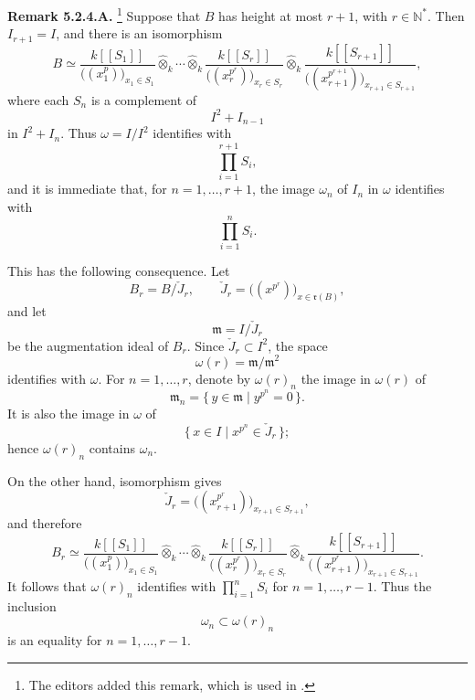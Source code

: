 
\medskip
\noindent\textbf{Remark 5.2.4.A.}
\label{sga3:VIIB:5.2.4.A}
\footnote{\label{sga3:VIIB:nde:161}The editors added this remark,
which is used in .}
Suppose that \(B\) has height at most \(r+1\), with
\(r\in\mathbb N^*\). Then \(I_{r+1}=I\), and there is an
isomorphism
\[
\tag{1}\label{sga3:vii:remark:5-2-4-a:equation:1}
  B
  \simeq
  \frac{k[[S_1]]}{\bigl((x_1^p)\bigr)_{x_1\in S_1}}
  \widehat\otimes_k\cdots\widehat\otimes_k
  \frac{k[[S_r]]}{\bigl((x_r^{p^r})\bigr)_{x_r\in S_r}}
  \widehat\otimes_k
  \frac{k[[S_{r+1}]]}
       {\bigl((x_{r+1}^{p^{r+1}})\bigr)_{x_{r+1}\in S_{r+1}}},
\]
where each \(S_n\) is a complement of
\[
  I^2+I_{n-1}
\]
in \(I^2+I_n\). Thus \(\omega=I/I^2\) identifies with
\[
  \prod_{i=1}^{r+1}S_i,
\]
and it is immediate that, for \(n=1,\ldots,r+1\), the image
\(\omega_n\) of \(I_n\) in \(\omega\) identifies with
\[
  \prod_{i=1}^{n}S_i.
\]

This has the following consequence. Let
\[
  B_r=B/\check J_r,
  \qquad
  \check J_r
  =
  \bigl((x^{p^r})\bigr)_{x\in\mathfrak r(B)},
\]
and let
\[
  \mathfrak m=I/\check J_r
\]
be the augmentation ideal of \(B_r\). Since
\(\check J_r\subset I^2\), the space
\[
  \omega(r)=\mathfrak m/\mathfrak m^2
\]
identifies with \(\omega\). For \(n=1,\ldots,r\), denote by
\(\omega(r)_n\) the image in \(\omega(r)\) of
\[
  \mathfrak m_n
  =
  \{\,y\in\mathfrak m\mid y^{p^n}=0\,\}.
\]
It is also the image in \(\omega\) of
\[
  \{\,x\in I\mid x^{p^n}\in\check J_r\,\};
\]
hence \(\omega(r)_n\) contains \(\omega_n\).

On the other hand, isomorphism \textup{} gives
\[
  \check J_r
  =
  \bigl((x_{r+1}^{p^r})\bigr)_{x_{r+1}\in S_{r+1}},
\]
and therefore
\[
\tag{2}\label{sga3:vii:remark:5-2-4-a:equation:2}
  B_r
  \simeq
  \frac{k[[S_1]]}{\bigl((x_1^p)\bigr)_{x_1\in S_1}}
  \widehat\otimes_k\cdots\widehat\otimes_k
  \frac{k[[S_r]]}{\bigl((x_r^{p^r})\bigr)_{x_r\in S_r}}
  \widehat\otimes_k
  \frac{k[[S_{r+1}]]}
       {\bigl((x_{r+1}^{p^r})\bigr)_{x_{r+1}\in S_{r+1}}}.
\]
It follows that \(\omega(r)_n\) identifies with
\(\prod_{i=1}^{n}S_i\) for \(n=1,\ldots,r-1\). Thus the
inclusion
\[
  \omega_n\subset\omega(r)_n
\]
is an equality for \(n=1,\ldots,r-1\).
